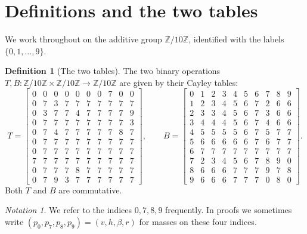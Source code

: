 \documentclass[11pt,reqno]{amsart}
\theoremstyle{plain}
\theoremstyle{definition}
\newtheorem{definition}[theorem]{Definition}
\theoremstyle{remark}
\newtheorem*{notation}{Notation}
\newcommand{\Z}{\mathbb{Z}}
\newcommand{\Zten}{\Z/10\Z}
\begin{document}
\section{Definitions and the two tables}\label{sec:setup}

We work throughout on the additive group $\Zten$, identified with
the labels $\{0,1,\dots,9\}$.

\begin{definition}[The two tables]\label{def:tables}
The two binary operations $T,B:\Zten\times\Zten\to\Zten$ are given
by their Cayley tables:
\[
T = \left[
\begin{array}{*{10}{c}}
0 & 0 & 0 & 0 & 0 & 0 & 0 & 7 & 0 & 0 \\
0 & 7 & 3 & 7 & 7 & 7 & 7 & 7 & 7 & 7 \\
0 & 3 & 7 & 7 & 4 & 7 & 7 & 7 & 7 & 9 \\
0 & 7 & 7 & 7 & 7 & 7 & 7 & 7 & 7 & 3 \\
0 & 7 & 4 & 7 & 7 & 7 & 7 & 7 & 8 & 7 \\
0 & 7 & 7 & 7 & 7 & 7 & 7 & 7 & 7 & 7 \\
0 & 7 & 7 & 7 & 7 & 7 & 7 & 7 & 7 & 7 \\
7 & 7 & 7 & 7 & 7 & 7 & 7 & 7 & 7 & 7 \\
0 & 7 & 7 & 7 & 8 & 7 & 7 & 7 & 7 & 7 \\
0 & 7 & 9 & 3 & 7 & 7 & 7 & 7 & 7 & 7
\end{array}
\right],\qquad
B = \left[
\begin{array}{*{10}{c}}
0 & 1 & 2 & 3 & 4 & 5 & 6 & 7 & 8 & 9 \\
1 & 2 & 3 & 4 & 5 & 6 & 7 & 2 & 6 & 6 \\
2 & 3 & 3 & 4 & 5 & 6 & 7 & 3 & 6 & 6 \\
3 & 4 & 4 & 4 & 5 & 6 & 7 & 4 & 6 & 6 \\
4 & 5 & 5 & 5 & 5 & 6 & 7 & 5 & 7 & 7 \\
5 & 6 & 6 & 6 & 6 & 6 & 7 & 6 & 7 & 7 \\
6 & 7 & 7 & 7 & 7 & 7 & 7 & 7 & 7 & 7 \\
7 & 2 & 3 & 4 & 5 & 6 & 7 & 8 & 9 & 0 \\
8 & 6 & 6 & 6 & 7 & 7 & 7 & 9 & 7 & 8 \\
9 & 6 & 6 & 6 & 7 & 7 & 7 & 0 & 8 & 0
\end{array}
\right].
\]
Both $T$ and $B$ are commutative.
\end{definition}

\begin{notation}
We refer to the indices $0,7,8,9$ frequently. In proofs we
sometimes write $(p_{0},p_{7},p_{8},p_{9})=(v,h,\beta,r)$ for
masses on these four indices.
\end{notation}
\end{document}
